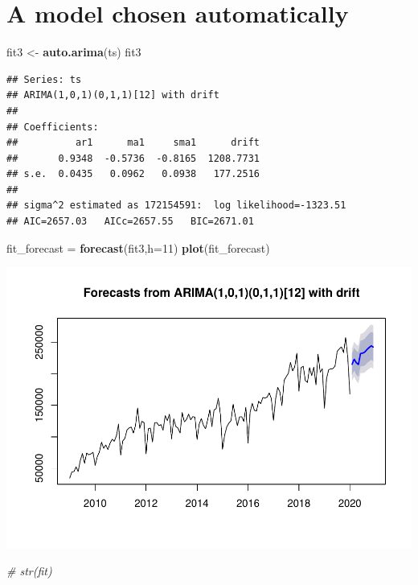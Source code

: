 \documentclass[
]{article}
\newenvironment{Shaded}{\begin{snugshade}}{\end{snugshade}}
\newcommand{\CommentTok}[1]{\textcolor[rgb]{0.56,0.35,0.01}{\textit{#1}}}
\newcommand{\DataTypeTok}[1]{\textcolor[rgb]{0.13,0.29,0.53}{#1}}
\newcommand{\DecValTok}[1]{\textcolor[rgb]{0.00,0.00,0.81}{#1}}
\newcommand{\KeywordTok}[1]{\textcolor[rgb]{0.13,0.29,0.53}{\textbf{#1}}}
\newcommand{\NormalTok}[1]{#1}
\newcommand{\StringTok}[1]{\textcolor[rgb]{0.31,0.60,0.02}{#1}}
\begin{document}
\hypertarget{a-model-chosen-automatically}{%
\section{A model chosen
automatically}\label{a-model-chosen-automatically}}

\begin{Shaded}
\begin{Highlighting}[]
\NormalTok{fit3 <-}\StringTok{ }\KeywordTok{auto.arima}\NormalTok{(ts)}
\NormalTok{fit3}
\end{Highlighting}
\end{Shaded}

\begin{verbatim}
## Series: ts 
## ARIMA(1,0,1)(0,1,1)[12] with drift 
## 
## Coefficients:
##          ar1      ma1     sma1      drift
##       0.9348  -0.5736  -0.8165  1208.7731
## s.e.  0.0435   0.0962   0.0938   177.2516
## 
## sigma^2 estimated as 172154591:  log likelihood=-1323.51
## AIC=2657.03   AICc=2657.55   BIC=2671.01
\end{verbatim}

\begin{Shaded}
\begin{Highlighting}[]
\NormalTok{fit_forecast =}\StringTok{ }\KeywordTok{forecast}\NormalTok{(fit3,}\DataTypeTok{h=}\DecValTok{11}\NormalTok{)}
\KeywordTok{plot}\NormalTok{(fit_forecast)}
\end{Highlighting}
\end{Shaded}

\includegraphics{tsf_export_files/figure-latex/unnamed-chunk-29-1.pdf}

\begin{Shaded}
\begin{Highlighting}[]
\CommentTok{# str(fit)}
\end{Highlighting}
\end{Shaded}
\end{document}
